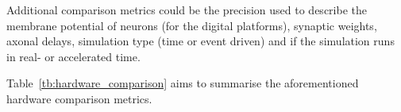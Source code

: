 Additional comparison metrics could be the precision used to describe the membrane potential of neurons (for the digital platforms), synaptic weights, axonal delays, simulation type (time or event driven) and if the simulation runs in real- or accelerated time.
 
Table~\ref{tb:hardware_comparison} aims to summarise the aforementioned hardware comparison metrics.
 




%
%
%
%
%
%

